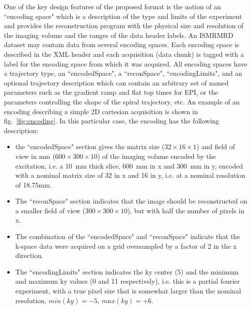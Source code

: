 \documentclass[12pt]{article}
\begin{document}
One of the key design features of the proposed format is the notion of an ``encoding space" which is a description of the type and limits of the experiment and provides the reconstruction program with the physical size and resolution of the imaging volume and the ranges of the data header labels.  An ISMRMRD dataset may contain data from several encoding spaces.  Each encoding space is described in the XML header and each acquisition (data chunk) is tagged with a label for the encoding space from which it was acquired. All encoding spaces have a trajectory type, an ``encodedSpace", a ``reconSpace", ``encodingLimits", and an optional trajectory description which can contain an arbitrary set of named parameters such as the gradient ramp and flat top times for EPI, or the parameters controlling the shape of the spiral trajectory, etc.  An example of an encoding describing a simple 2D cartesian acquisition is shown in fig.~\ref{fig:encoding}.  In this particular case, the encoding has the following description:
\begin{itemize}
\item the ``encodedSpace" section gives the matrix size ($32\times16\times1$) and field of view in mm ($600\times300\times10$) of the imaging volume encoded by the excitation, i.e. a 10~mm thick slice, 600~mm in x and 300~mm in y, encoded with a nominal matrix size of 32 in x and 16 in y, i.e. at a nominal resolution of 18.75mm.
\item The ``reconSpace" section indicates that the image should be reconstructed on a smaller field of view ($300\times300\times10$), but with half the number of pixels in x.
\item The combination of the ``encodedSpace" and ``reconSpace" indicate that the k-space data were acquired on a grid oversampled by a factor of 2 in the x direction.
\item The ``encodingLimits" section indicates the ky center (5) and the minimum and maximum ky values (0 and 11 respectively), i.e. this is a partial fourier experiment, with a true pixel size that is somewhat larger than the nominal resolution, $min(ky)=-5$, $max(ky)=+6$.
\end{itemize}
\end{document}
